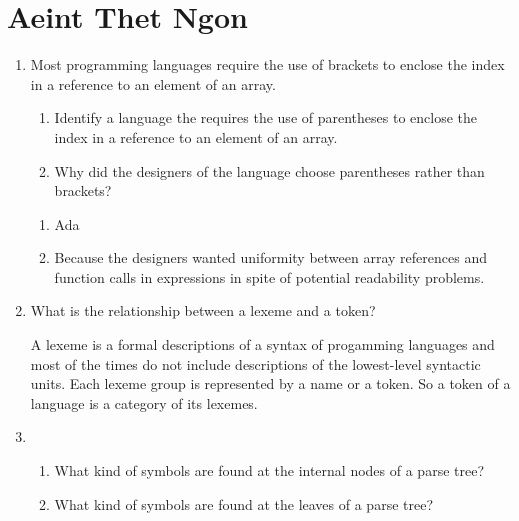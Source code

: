 
\chapter{Aeint Thet Ngon}

\begin{enumerate}
  \item Most programming languages require the use of brackets to
    enclose the index in a reference to an element of an array.
  \begin{enumerate}
    \item Identify a language the requires the use of parentheses
      to enclose the index in a reference to an element of an array.
    \item Why did the designers of the language choose parentheses
      rather than brackets?
    \end{enumerate}

  \begin{answer}

  \begin{enumerate}
    \item Ada
    \item Because the designers wanted uniformity between array references and function calls in expressions in spite of potential readability problems. 
    \end{enumerate}

    \end{answer}
    
  \item What is the relationship between a lexeme and a token?

  \begin{answer}

    A lexeme is a formal descriptions of a syntax of progamming languages and most of the times do not include descriptions of the lowest-level syntactic units. Each lexeme group is represented by a name or a token. So a token of a language is a category of its lexemes.

    \end{answer}

  \item
  \begin{enumerate}
    \item What kind of symbols are found at the internal nodes of a
      parse tree?
    \item What kind of symbols are found at the leaves of a parse tree?
    \end{enumerate}


\end{enumerate}
